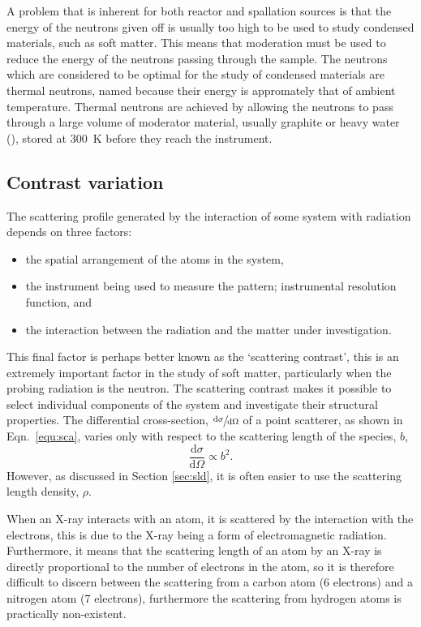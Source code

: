 A problem that is inherent for both reactor and spallation sources is that the energy of the neutrons given off is usually too high to be used to study condensed materials, such as soft matter. This means that moderation must be used to reduce the energy of the neutrons passing through the sample. The neutrons which are considered to be optimal for the study of condensed materials are thermal neutrons, named because their energy is appromately that of ambient temperature. Thermal neutrons are achieved by allowing the neutrons to pass through a large volume of moderator material, usually graphite or heavy water (), stored at \SI{300}{\kelvin} before they reach the instrument.\cite{Sivia2011}

\subsection{Contrast variation}
\label{convar}

The scattering profile generated by the interaction of some system with radiation depends on three factors:
%
\begin{itemize}
	\item the spatial arrangement of the atoms in the system,
	\item the instrument being used to measure the pattern; instrumental resolution function, and
	\item the interaction between the radiation and the matter under investigation.
\end{itemize}
%
This final factor is perhaps better known as the `scattering contrast', this is an extremely important factor in the study of soft matter, particularly when the probing radiation is the neutron. The scattering contrast makes it possible to select individual components of the system and investigate their structural properties.\cite{Schurtenberger2002} The differential cross-section, $\sfrac{\text{d}\sigma}{\text{d}\Omega}$ of a point scatterer, as shown in Eqn.~\ref{equ:sca}, varies only with respect to the scattering length of the species, $b$,
%
\begin{equation}
	\frac{\text{d}\sigma}{\text{d}\Omega} \propto b^2.
\end{equation}
%
However, as discussed in Section \ref{sec:sld}, it is often easier to use the scattering length density, $\rho$.

When an X-ray interacts with an atom, it is scattered by the interaction with the electrons, this is due to the X-ray being a form of electromagnetic radiation. Furthermore, it means that the scattering length of an atom by an X-ray is directly proportional to the number of electrons in the atom, so it is therefore difficult to discern between the scattering from a carbon atom (6 electrons) and a nitrogen atom (7 electrons), furthermore the scattering from hydrogen atoms is practically non-existent.

